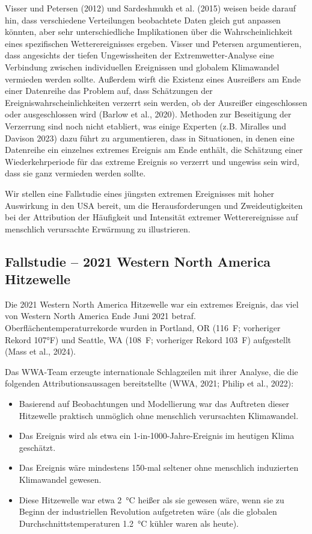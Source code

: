 \documentclass[12pt,paper=a4,DIV=12,parskip=never,chapterprefix=false,headings=standardclasses]{scrreprt}
\begin{document}
Visser und Petersen (2012) und Sardeshmukh et al. (2015) weisen beide darauf hin, dass verschiedene Verteilungen beobachtete Daten gleich gut anpassen könnten, aber sehr unterschiedliche Implikationen über die Wahrscheinlichkeit eines spezifischen Wetterereignisses ergeben. Visser und Petersen argumentieren, dass angesichts der tiefen Ungewissheiten der Extremwetter-Analyse eine Verbindung zwischen individuellen Ereignissen und globalem Klimawandel vermieden werden sollte. Außerdem wirft die Existenz eines Ausreißers am Ende einer Datenreihe das Problem auf, dass Schätzungen der Ereigniswahrscheinlichkeiten verzerrt sein werden, ob der Ausreißer eingeschlossen oder ausgeschlossen wird (Barlow et al., 2020). Methoden zur Beseitigung der Verzerrung sind noch nicht etabliert, was einige Experten (z.B. Miralles und Davison 2023) dazu führt zu argumentieren, dass in Situationen, in denen eine Datenreihe ein einzelnes extremes Ereignis am Ende enthält, die Schätzung einer Wiederkehrperiode für das extreme Ereignis so verzerrt und ungewiss sein wird, dass sie ganz vermieden werden sollte.

Wir stellen eine Fallstudie eines jüngsten extremen Ereignisses mit hoher Auswirkung in den USA bereit, um die Herausforderungen und Zweideutigkeiten bei der Attribution der Häufigkeit und Intensität extremer Wetterereignisse auf menschlich verursachte Erwärmung zu illustrieren.

\subsection{Fallstudie – 2021 Western North America Hitzewelle}
Die 2021 Western North America Hitzewelle war ein extremes Ereignis, das viel von Western North America Ende Juni 2021 betraf. Oberflächentemperaturrekorde wurden in Portland, OR (\SI{116}{F}; vorheriger Rekord 107°F) und Seattle, WA (\SI{108}{F}; vorheriger Rekord \SI{103}{F}) aufgestellt (Mass et al., 2024).

Das WWA-Team erzeugte internationale Schlagzeilen mit ihrer Analyse, die die folgenden Attributionsaussagen bereitstellte (WWA, 2021; Philip et al., 2022):

\begin{itemize}
\item Basierend auf Beobachtungen und Modellierung war das Auftreten dieser Hitzewelle praktisch unmöglich ohne menschlich verursachten Klimawandel. 
\item Das Ereignis wird als etwa ein 1-in-1000-Jahre-Ereignis im heutigen Klima geschätzt. 
\item Das Ereignis wäre mindestens 150-mal seltener ohne menschlich induzierten Klimawandel gewesen. 
\item Diese Hitzewelle war etwa \SI{2}{\celsius} heißer als sie gewesen wäre, wenn sie zu Beginn der industriellen Revolution aufgetreten wäre (als die globalen Durchschnittstemperaturen \SI{1.2}{\celsius} kühler waren als heute). 
\end{itemize}
\end{document}
